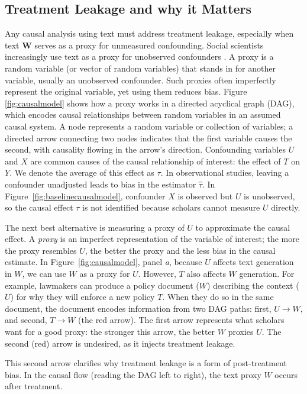 \documentclass[11pt]{article}
\newcommand{\bW}{\bm{W}}  %
\begin{document}
\subsection{Treatment Leakage and why it Matters}
Any causal analysis using text must address treatment leakage, especially when text $\bW$ serves as a proxy for unmeasured confounding. Social scientists increasingly use text as a proxy for unobserved confounders \citep{miao2018identifying,tchetgen2020}. A proxy is a random variable (or vector of random variables) that stands in for another variable, usually an unobserved confounder. Such proxies often imperfectly represent the original variable, yet using them reduces bias. Figure \ref{fig:causalmodel} shows how a proxy works in a directed acyclical graph (DAG), which encodes causal relationships between random variables in an assumed causal system. %
A node represents a random variable or collection of variables; a directed arrow connecting two nodes indicates that the first variable causes the second, with causality flowing in the arrow's direction. Confounding variables $U$ and $X$ are common causes of the causal relationship of interest: the effect of $T$ on $Y$. We denote the average of this effect as $\tau$. In observational studies, leaving a confounder unadjusted leads to bias in the estimator $\hat{\tau}$. In Figure~\ref{fig:baselinecausalmodel}, confounder $X$ is observed but $U$ is unobserved, so the causal effect $\tau$ is not identified because scholars cannot measure $U$ directly.

The next best alternative is measuring a proxy of $U$ to approximate the causal effect. A \textit{proxy} is an imperfect representation of the variable of interest; the more the proxy resembles $U$, the better the proxy and the less bias in the causal estimate. In Figure~\ref{fig:causalmodel}, panel \textit{a}, because $U$ affects text generation in $W$, we can use $W$ as a proxy for $U$. However, $T$ also affects $W$ generation. For example, lawmakers can produce a policy document ($W$) describing the context ($U$) for why they will enforce a new policy $T$. When they do so in the same document, the document encodes information from two DAG paths: first, $U \rightarrow W$, and second, $T \rightarrow W$ (the red arrow). The first arrow represents what scholars want for a good proxy: the stronger this arrow, the better $W$ proxies $U$. The second (red) arrow is undesired, as it injects treatment leakage.

This second arrow clarifies why treatment leakage is a form of post-treatment bias. In the causal flow (reading the DAG left to right), the text proxy $W$ occurs after treatment.
\end{document}
